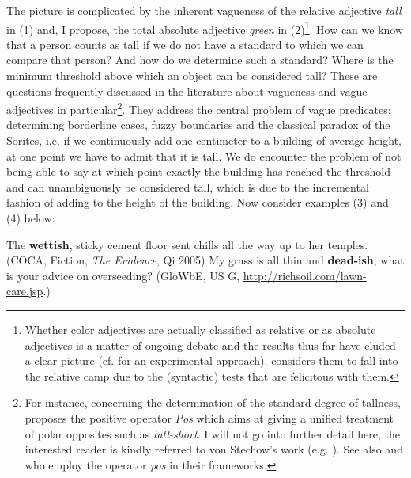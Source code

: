 \documentclass[output=paper
,modfonts
,nonflat]{langsci/langscibook}
\begin{document}
The picture is complicated by the inherent vagueness of the relative adjective  \textit{tall} in (1) and, I propose, the total absolute adjective  \textit{green} in (2)\footnote{Whether color adjectives are actually classified as relative or as absolute adjectives is a matter of ongoing debate and the results thus far have eluded a clear picture (cf. \citealt{Hansen2017} for an experimental approach). \citet{Burnett2012a, Burnett2012b} considers them to fall into the relative camp due to the (syntactic) tests that are felicitous with them.}. How can we know that a person counts as tall if we do not have a standard to which we can compare that person? And how do we determine such a standard? Where is the minimum threshold above which an object can be considered tall? These are questions frequently discussed in the literature about vagueness and vague adjectives in particular\footnote{For instance, concerning the determination of the standard degree of tallness, \citet {vonStechow1984} proposes the positive operator \textit{Pos} which aims at giving a unified treatment of polar opposites such as \textit{tall-short}. I will not go into further detail here, the interested reader is kindly referred to von Stechow's work (e.g. \citeyear{vonStechow1984,vonStechow2009}). See also \citet*{Kennedy2005} and \citet{Kennedy2007} who employ the operator \textit{pos} in their frameworks.}. They address the central problem of vague predicates: determining borderline cases, fuzzy boundaries and the classical paradox of the Sorites, i.e. if we continuously add one centimeter to a building of average height, at one point we have to admit that it is tall. We do encounter the problem of not being able to say at which point exactly the building has reached the threshold and can unambiguously be considered tall, which is due to the incremental fashion of adding to the height of the building.
Now consider examples (3) and (4) below:

\ea
	The \textbf{wettish}, sticky cement floor sent chills all the way up to her temples. (COCA, Fiction,  \textit{The Evidence}, Qi 2005)
\z
\ea
	My grass is all thin and \textbf{dead-ish}, what is your advice on overseeding? (GloWbE, US G, \url{http://richsoil.com/lawn-care.jsp}.)
\z
\end{document}
